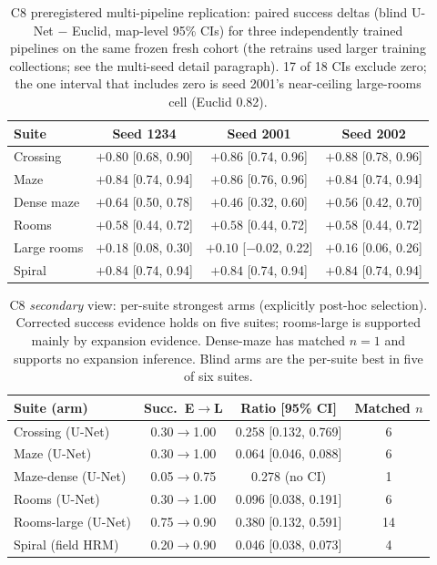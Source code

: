 \documentclass[letterpaper]{article} %
\newcommand{\stage}[1]{\textsc{#1}}
\begin{document}
\begin{table}[t]
\centering
\small
\setlength{\tabcolsep}{2.6pt}
\begin{tabular}{@{}lccc@{}}
\toprule
Suite & Seed 1234 & Seed 2001 & Seed 2002 \\
\midrule
Crossing & $+0.80$ [0.68, 0.90] & $+0.86$ [0.74, 0.96] & $+0.88$ [0.78, 0.96] \\
Maze & $+0.84$ [0.74, 0.94] & $+0.86$ [0.76, 0.96] & $+0.84$ [0.74, 0.94] \\
Dense maze & $+0.64$ [0.50, 0.78] & $+0.46$ [0.32, 0.60] & $+0.56$ [0.42, 0.70] \\
Rooms & $+0.58$ [0.44, 0.72] & $+0.58$ [0.44, 0.72] & $+0.58$ [0.44, 0.72] \\
Large rooms & $+0.18$ [0.08, 0.30] & $+0.10$ [$-$0.02, 0.22] & $+0.16$ [0.06, 0.26] \\
Spiral & $+0.84$ [0.74, 0.94] & $+0.84$ [0.74, 0.94] & $+0.84$ [0.74, 0.94] \\
\bottomrule
\end{tabular}
\caption{\stage{C8} preregistered multi-pipeline replication: paired success deltas (blind U-Net $-$ Euclid, map-level 95\% CIs) for three independently trained pipelines on the same frozen fresh cohort (the retrains used larger training collections; see the multi-seed detail paragraph). 17 of 18 CIs exclude zero; the one interval that includes zero is seed 2001's near-ceiling large-rooms cell (Euclid 0.82).}
\label{tab:c8seeds}
\end{table}

\begin{table}[t]
\centering
\small
\setlength{\tabcolsep}{3pt}
\begin{tabular}{@{}lccc@{}}
\toprule
Suite (arm) & Succ.\ E$\to$L & Ratio [95\% CI] & Matched $n$ \\
\midrule
Crossing (U-Net) & 0.30$\to$1.00 & 0.258 [0.132, 0.769] & 6 \\
Maze (U-Net) & 0.30$\to$1.00 & 0.064 [0.046, 0.088] & 6 \\
Maze-dense (U-Net) & 0.05$\to$0.75 & 0.278 (no CI) & 1 \\
Rooms (U-Net) & 0.30$\to$1.00 & 0.096 [0.038, 0.191] & 6 \\
Rooms-large (U-Net) & 0.75$\to$0.90 & 0.380 [0.132, 0.591] & 14 \\
Spiral (field HRM) & 0.20$\to$0.90 & 0.046 [0.038, 0.073] & 4 \\
\bottomrule
\end{tabular}
\caption{\stage{C8} \emph{secondary} view: per-suite strongest arms (explicitly post-hoc selection). Corrected success evidence holds on five suites; rooms-large is supported mainly by expansion evidence. Dense-maze has matched $n{=}1$ and supports no expansion inference. Blind arms are the per-suite best in five of six suites.}
\label{tab:c8}
\end{table}
\end{document}
